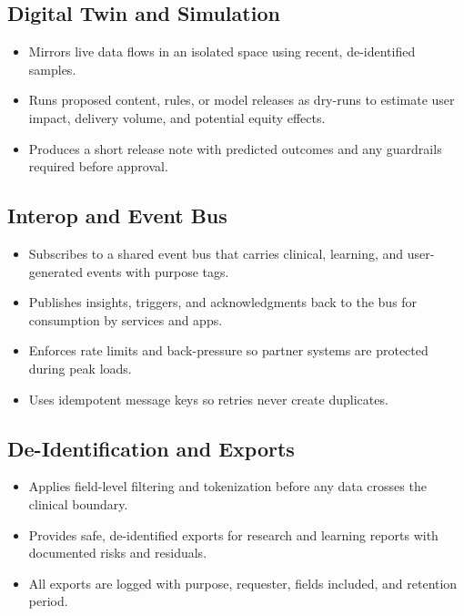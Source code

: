 \documentclass[12pt]{article}
\begin{document}
\subsection*{Digital Twin and Simulation}
\begin{itemize}[leftmargin=*]
  \item Mirrors live data flows in an isolated space using recent, de-identified samples.
  \item Runs proposed content, rules, or model releases as dry-runs to estimate user impact, delivery volume, and potential equity effects.
  \item Produces a short release note with predicted outcomes and any guardrails required before approval.
\end{itemize}

\subsection*{Interop and Event Bus}
\begin{itemize}[leftmargin=*]
  \item Subscribes to a shared event bus that carries clinical, learning, and user-generated events with purpose tags.
  \item Publishes insights, triggers, and acknowledgments back to the bus for consumption by services and apps.
  \item Enforces rate limits and back-pressure so partner systems are protected during peak loads.
  \item Uses idempotent message keys so retries never create duplicates.
\end{itemize}

\subsection*{De-Identification and Exports}
\begin{itemize}[leftmargin=*]
  \item Applies field-level filtering and tokenization before any data crosses the clinical boundary.
  \item Provides safe, de-identified exports for research and learning reports with documented risks and residuals.
  \item All exports are logged with purpose, requester, fields included, and retention period.
\end{itemize}
\end{document}
